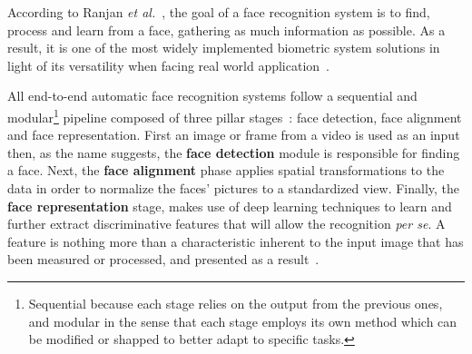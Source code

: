 \documentclass[class=report, crop=false, a4paper, 12pt]{standalone}
\begin{document}
\par According to Ranjan \textit{et al.}~\autocite{ranjanDeepLearningUnderstanding2018}, the goal of a face recognition system is to find, process and learn from a face, gathering as much information as possible. As a result, it is one of the most widely implemented biometric system solutions in light of its versatility when facing real world application~\autocite{duElementsEndtoendDeep2022}.

\par All end-to-end automatic face recognition systems follow a sequential and modular\footnote{Sequential because each stage relies on the output from the previous ones, and modular in the sense that each stage employs its own method which can be modified or shapped to better adapt to specific tasks.} pipeline  composed of three pillar stages~\autocite{wangDeepFaceRecognition2021}: face detection, face alignment and face representation. First an image or frame from a video is used as an input then, as the name suggests, the \textbf{face detection} module is responsible for finding a face. Next, the \textbf{face alignment} phase applies spatial transformations to the data in order to normalize the faces' pictures to a standardized view. Finally, the \textbf{face representation} stage, makes use of deep learning techniques to learn and further extract discriminative features that will allow the recognition \textit{per se}. A feature is nothing more than a characteristic inherent to the input image that has been measured or processed, and presented as a result~\autocite{Goodfellow-et-al-2016}.
\end{document}
